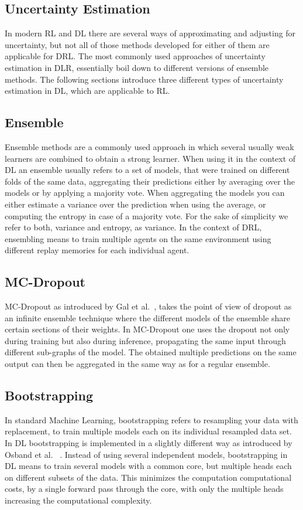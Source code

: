 \documentclass[11pt,a4paper]{article}
\begin{document}
	\subsection{Uncertainty Estimation}\label{subsec:uncertainty-estimation}
	In modern RL and DL there are several ways of approximating and adjusting for uncertainty, but not all of those methods developed for either of them are applicable for DRL.
	The most commonly used approaches of uncertainty estimation in DLR, essentially boil down to different versions of ensemble methods.
	The following sections introduce three different types of uncertainty estimation in DL, which are applicable to RL.

	\subsection{Ensemble}\label{subsec:ensemble}
	Ensemble methods are a commonly used approach in which several usually weak learners are combined to obtain a strong learner.
	When using it in the context of DL an ensemble usually refers to a set of models, that were trained on different folds of the same data, aggregating their predictions either by averaging over the models or by applying a majority vote.
	When aggregating the models you can either estimate a variance over the prediction when using the average, or computing the entropy in case of a majority vote.
	For the sake of simplicity we refer to both, variance and entropy, as variance.
	In the context of DRL, ensembling means to train multiple agents on the same environment using different replay memories for each individual agent.

	\subsection{MC-Dropout}\label{subsec:mc-dropout}
	MC-Dropout as introduced by Gal et al.~\cite{gal_dropout_2016}, takes the point of view of dropout as an infinite ensemble technique where the different models of the ensemble share certain sections of their weights.
	In MC-Dropout one uses the dropout not only during training but also during inference, propagating the same input through different sub-graphs of the model.
	The obtained multiple predictions on the same output can then be aggregated in the same way as for a regular ensemble.

	\subsection{Bootstrapping}\label{subsec:bootstrapping}
	In standard Machine Learning, bootstrapping refers to resampling your data with replacement, to train multiple models each on its individual resampled data set.
	In DL bootstrapping is implemented in a slightly different way as introduced by Osband et al.
	~\cite{osband_deep_2016}.
	Instead of using several independent models, bootstrapping in DL means to train several models with a common core, but multiple heads each on different subsets of the data.
	This minimizes the computation computational costs, by a single forward pass through the core, with only the multiple heads increasing the computational complexity.
\end{document}

